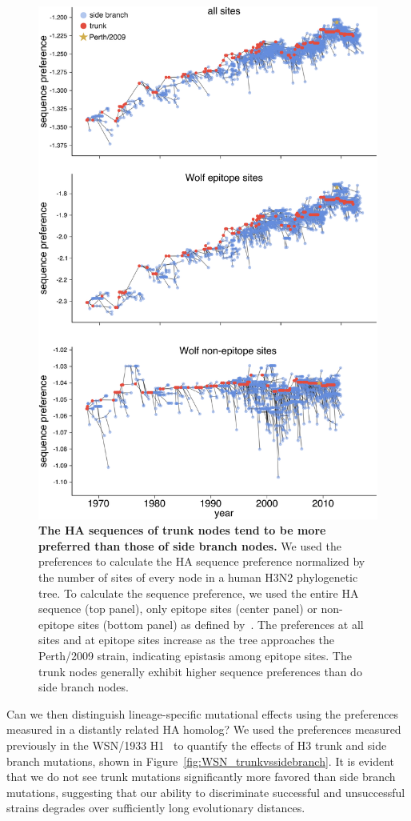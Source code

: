 \documentclass[9pt,twocolumn,twoside]{pnas-new}
\begin{document}
\begin{figure}
\centering
\includegraphics[width=12cm]{figs/sequence_preference/sequence_preference.pdf}
\caption{\label{fig:sequence_preference}
{\bf The HA sequences of trunk nodes tend to be more preferred than those of side branch nodes.}
We used the preferences to calculate the HA sequence preference normalized by the number of sites of every node in a human H3N2 phylogenetic tree.
To calculate the sequence preference, we used the entire HA sequence (top panel), only epitope sites (center panel) or non-epitope sites (bottom panel) as defined by~\cite{wolf2006long}.
The preferences at all sites and at epitope sites increase as the tree approaches the Perth/2009 strain, indicating epistasis among epitope sites.
The trunk nodes generally exhibit higher sequence preferences than do side branch nodes.
}
\end{figure}

Can we then distinguish lineage-specific mutational effects using the preferences measured in a distantly related HA homolog?
We used the preferences measured previously in the WSN/1933 H1~\citep{doud2016accurate} to quantify the effects of H3 trunk and side branch mutations, shown in Figure~\ref{fig:WSN_trunkvssidebranch}.
It is evident that we do not see trunk mutations significantly more favored than side branch mutations, suggesting that our ability to discriminate successful and unsuccessful strains degrades over sufficiently long evolutionary distances. 
\end{document}
